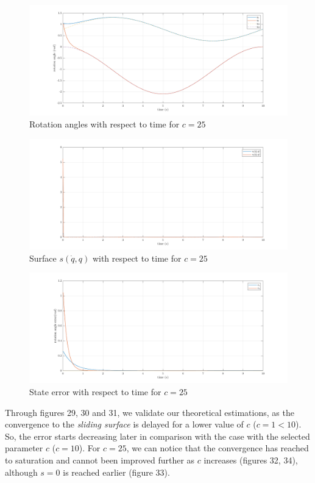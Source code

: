 \documentclass[a4paper]{article}
\begin{document}
\begin{figure}[H]
    \centering
    \includegraphics[width=15cm]{fig/sim2/c25/q25.png}
    \caption{Rotation angles with respect to time for $c=25$}
\end{figure}
\begin{figure}[H]
    \centering
    \includegraphics[width=15cm]{fig/sim2/c25/s25.png}
    \caption{Surface $s(\dot{q}, q)$ with respect to time for $c=25$}
\end{figure}
\begin{figure}[H]
    \centering
    \includegraphics[width=15cm]{fig/sim2/c25/e25.png}
    \caption{State error with respect to time for $c=25$}
\end{figure}

\noindent\hspace{-2pt}
Through figures 29, 30 and 31, we validate our theoretical estimations, as the convergence to the 
\textit{sliding surface} is delayed for a lower value of $c$ ($c=1<10$). So, the error starts decreasing 
later in comparison with the case with the selected parameter $c$ ($c=10$).
For $c=25$, we can notice that the convergence has reached to saturation and cannot been improved further
as $c$ increases (figures 32, 34), although $s=0$ is reached earlier (figure 33).
\end{document}
